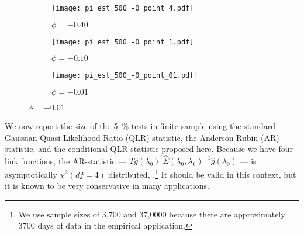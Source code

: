 \documentclass[11pt, letterpaper, twoside]{article}
\begin{document}
\begin{figure}[htb]
  
  \caption[t-statistics]{Parameter Estimates}
  \label{fig:sim_parameter_estimates}


  \begin{subfigure}[t]{.32\textwidth}
    \caption[phi = -0.40]{$\phi = -0.40$}
    \texttt{[image: pi\_est\_500\_-0\_point\_4.pdf]}
  \end{subfigure}
  \begin{subfigure}[t]{.32\textwidth}
    \caption[phi = -0.10]{$\phi = -0.10$}
    \texttt{[image: pi\_est\_500\_-0\_point\_1.pdf]}
  \end{subfigure}
  \begin{subfigure}[t]{.32\textwidth}
    \caption[phi = -0.01]{$\phi = -0.01$}
    \texttt{[image: pi\_est\_500\_-0\_point\_01.pdf]}
  \end{subfigure}

\end{figure}

We now report the size of the \SI{5}{\percent} tests in finite-sample using the standard Gaussian Quasi-Likelihood Ratio (QLR) statistic, the Anderson-Rubin (AR) statistic, and the conditional-QLR statistic proposed here.  Because we have four link functions, the AR-statistic  --- $T\widehat{g}(\lambda _{0})^{\prime }\widehat{\Sigma }(\lambda _{0},\lambda _{0})^{ -1}\widehat{g}(\lambda _{0})$ --- is asymptotically $\chi^2(df=4)$ distributed, \parencite{stock2000GMM}.\footnote{We use sample sizes of 3,700 and 37,0000  because there are approximately 3700 days of data in the empirical application.}
It should be valid in this context, but it is known to be very conservative in many applications. 
\end{document}
